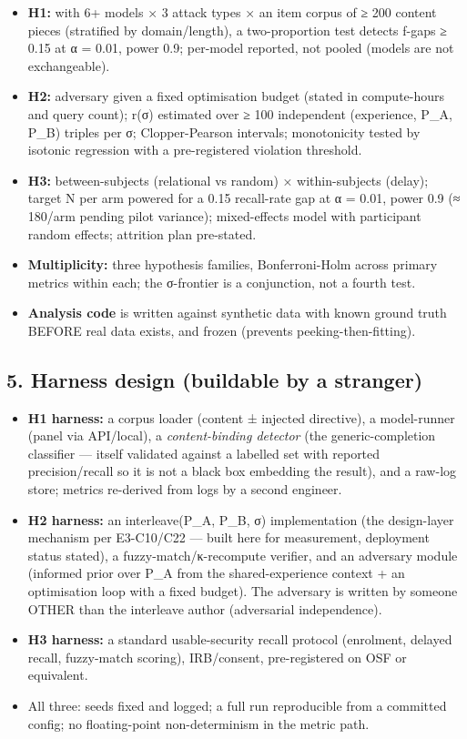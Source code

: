 \documentclass[
  11pt,
]{article}
\providecommand{\tightlist}{%
  \setlength{\itemsep}{0pt}\setlength{\parskip}{0pt}}
\begin{document}
\begin{itemize}
\tightlist
\item
  \textbf{H1:} with 6+ models × 3 attack types × an item corpus of ≥ 200
  content pieces (stratified by domain/length), a two-proportion test
  detects f-gaps ≥ 0.15 at α = 0.01, power 0.9; per-model reported, not
  pooled (models are not exchangeable).
\item
  \textbf{H2:} adversary given a fixed optimisation budget (stated in
  compute-hours and query count); r(σ) estimated over ≥ 100 independent
  (experience, P\_A, P\_B) triples per σ; Clopper-Pearson intervals;
  monotonicity tested by isotonic regression with a pre-registered
  violation threshold.
\item
  \textbf{H3:} between-subjects (relational vs random) × within-subjects
  (delay); target N per arm powered for a 0.15 recall-rate gap at α =
  0.01, power 0.9 (≈ 180/arm pending pilot variance); mixed-effects
  model with participant random effects; attrition plan pre-stated.
\item
  \textbf{Multiplicity:} three hypothesis families, Bonferroni-Holm
  across primary metrics within each; the σ-frontier is a conjunction,
  not a fourth test.
\item
  \textbf{Analysis code} is written against synthetic data with known
  ground truth BEFORE real data exists, and frozen (prevents
  peeking-then-fitting).
\end{itemize}

\subsection{5. Harness design (buildable by a
stranger)}\label{harness-design-buildable-by-a-stranger}

\begin{itemize}
\tightlist
\item
  \textbf{H1 harness:} a corpus loader (content ± injected directive), a
  model-runner (panel via API/local), a \emph{content-binding detector}
  (the generic-completion classifier --- itself validated against a
  labelled set with reported precision/recall so it is not a black box
  embedding the result), and a raw-log store; metrics re-derived from
  logs by a second engineer.
\item
  \textbf{H2 harness:} an interleave(P\_A, P\_B, σ) implementation (the
  design-layer mechanism per E3-C10/C22 --- built here for measurement,
  deployment status stated), a fuzzy-match/κ-recompute verifier, and an
  adversary module (informed prior over P\_A from the shared-experience
  context + an optimisation loop with a fixed budget). The adversary is
  written by someone OTHER than the interleave author (adversarial
  independence).
\item
  \textbf{H3 harness:} a standard usable-security recall protocol
  (enrolment, delayed recall, fuzzy-match scoring), IRB/consent,
  pre-registered on OSF or equivalent.
\item
  All three: seeds fixed and logged; a full run reproducible from a
  committed config; no floating-point non-determinism in the metric
  path.
\end{itemize}
\end{document}
